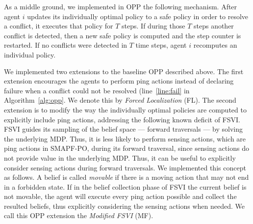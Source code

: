\documentclass[letterpaper]{article} %
\begin{document}
 As a middle ground, we implemented in OPP the following mechanism. After agent $i$ updates its individually optimal policy to a safe policy in order to resolve a conflict, it executes that policy for $T$ steps. If during those $T$ steps another conflict is detected, then a new safe policy is computed and the step counter is restarted. If no conflicts were detected in $T$ time steps, agent $i$ recomputes an individual  policy.



We implemented two extensions to the baseline OPP described above.
The first extension encourages the agents to perform ping actions instead of declaring failure when a conflict could not be resolved (line~\ref{line:fail} in Algorithm~\ref{alg:opp}. We denote this by \emph{Forced Localization} (FL).
The second extension is to modify the way the individually optimal policies are computed to explicitly include ping actions, addressing the following known deficit of FSVI.
FSVI guides its sampling of the belief space --- forward traversals --- by solving the underlying MDP.
Thus, it is less likely to perform sensing actions, which are ping actions in SMAPF-PO, during its forward traversal, since sensing actions do not provide value in the underlying MDP.
Thus, it can be useful to explicitly consider sensing actions during forward traversals.
We implemented this concept as follows.
A belief is called \emph{movable} if there is a moving action that may not end in a forbidden state.
If in the belief collection phase of FSVI the current belief is not movable, the agent will execute every ping action possible and collect the resulted beliefs, thus explicitly considering the sensing actions when needed.
We call this OPP extension the \emph{Modified FSVI} (MF).
\end{document}
